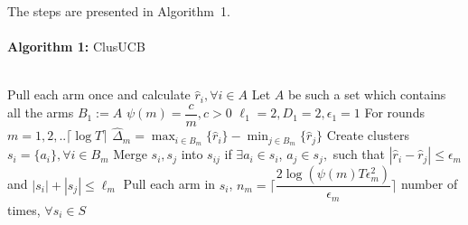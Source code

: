 The steps are presented in Algorithm~1.\\%
\noindent\makebox[\linewidth]{\rule{\textwidth}{0.8pt}}\\[-0.1cm]
\textbf{Algorithm 1:} ClusUCB\\[-0.3cm]
\noindent\makebox[\linewidth]{\rule{\textwidth}{0.4pt}}\\[-0.3cm]
\begin{algorithmic}[1]
\State Pull each arm once and calculate $\hat{r}_{i}, \forall i\in A$
\State Let $A$ be such a set which contains all the arms
\State $B_{1}:=A$
\State $\psi(m)=\dfrac{c}{m}, c>0$
\State $\ell_{1}=2,D_{1}=2, \epsilon_{1}=1$
\State For rounds $m=1,2,.. \lceil\log T\rceil$
\State \hspace*{2em} $\hat{\Delta}_{m}=\max_{i\in B_{m}}{\lbrace\hat{r}_{i}\rbrace}-\min_{j\in B_{m}}{\lbrace\hat{r}_{j}\rbrace}$
\State \hspace*{2em} Create clusters $s_{i}=\lbrace a_{i}\rbrace, \forall i\in B_{m}$
\State \hspace*{2em} Merge $s_{i},s_{j}$ into $s_{ij}$ if $\exists a_{i}\in s_{i} $, $ a_{j}\in s_{j},$ such that $|\hat{r}_{i}-\hat{r}_{j}|\leq\epsilon_{m}$ and \hspace*{2em} $|s_{i}|+|s_{j}|\leq \ell_{m}$
\State \hspace*{2em} Pull each arm in $s_{i}$, \newline\hspace*{2em}$n_{m}=\bigg\lceil\dfrac{2\log{(\psi(m)T\epsilon_{m}^{2})}}{\epsilon_{m}}\bigg\rceil$ number of times, $\forall s_{i}\in S$ 

\end{algorithmic}

